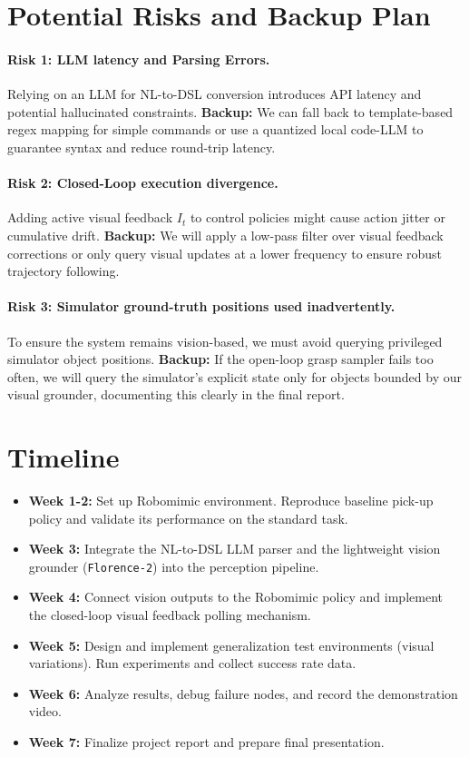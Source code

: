 \documentclass[conference]{IEEEtran}
\begin{document}
\section{Potential Risks and Backup Plan}
\label{sec:risks}

\paragraph{Risk 1: LLM latency and Parsing Errors.}
Relying on an LLM for NL-to-DSL conversion introduces API latency and potential hallucinated constraints. \textbf{Backup:} We can fall back to template-based regex mapping for simple commands or use a quantized local code-LLM to guarantee syntax and reduce round-trip latency.

\paragraph{Risk 2: Closed-Loop execution divergence.}
Adding active visual feedback $I_t$ to control policies might cause action jitter or cumulative drift. \textbf{Backup:} We will apply a low-pass filter over visual feedback corrections or only query visual updates at a lower frequency to ensure robust trajectory following.

\paragraph{Risk 3: Simulator ground-truth positions used inadvertently.}
To ensure the system remains vision-based, we must avoid querying privileged simulator object positions. \textbf{Backup:} If the open-loop grasp sampler fails too often, we will query the simulator's explicit state only for objects bounded by our visual grounder, documenting this clearly in the final report.

\section{Timeline}
\label{sec:timeline}

\begin{itemize}
    \item \textbf{Week 1-2:} Set up Robomimic environment. Reproduce baseline pick-up policy and validate its performance on the standard task.
    \item \textbf{Week 3:} Integrate the NL-to-DSL LLM parser and the lightweight vision grounder (\texttt{Florence-2}) into the perception pipeline.
    \item \textbf{Week 4:} Connect vision outputs to the Robomimic policy and implement the closed-loop visual feedback polling mechanism.
    \item \textbf{Week 5:} Design and implement generalization test environments (visual variations). Run experiments and collect success rate data.
    \item \textbf{Week 6:} Analyze results, debug failure nodes, and record the demonstration video.
    \item \textbf{Week 7:} Finalize project report and prepare final presentation.
\end{itemize}



\end{document}
